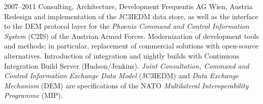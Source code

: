 \cventry
{2007--2011}
{Consulting, Architecture, Development}
{}
{Frequentis AG}
{Wien, Austria}
{
  Redesign and implementation of the JC3IEDM data store, as well as the interface
  to the DEM protocol layer for the \emph{Phoenix Command and Control Information System} (C2IS)
  of the Austrian Armed Forces.
  Modernization of development tools and methods; in particular, replacement of commercial solutions
  with open-source alternatives.
  Introduction of integration and nightly builds with Continuous Integration Build Server (Hudson/Jenkins).
  \emph{Joint Consultation, Command and Control Information
  Exchange Data Model} (JC3IEDM) and \emph{Data Exchange Mechanism} (DEM) are specifications of the
  NATO \emph{Multilateral Interoperability Programme} (MIP).
}
